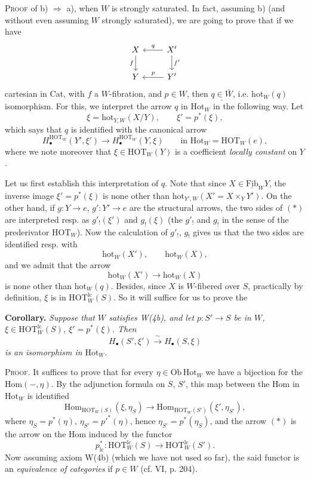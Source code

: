 \documentclass[11pt]{article}
\newcommand{\printedpage}[1]{\marginpar{\footnotesize p.~#1}}
\newcommand{\msp}[1]{\marginpar{\footnotesize [#1]}}
\newcommand{\Fib}{\mathrm{Fib}}
\newcommand{\HOT}{\mathrm{HOT}}
\newcommand{\Hot}{\mathrm{Hot}}
\newcommand{\hot}{\mathrm{hot}}
\newcommand{\Hom}{\mathrm{Hom}}
\begin{document}
\textsc{Proof} of b) $\Longrightarrow$ a), when $W$ is strongly saturated. In fact, assuming b) (and without even assuming $W$ strongly saturated), we are going to prove that if we have
\[
\begin{tikzcd}
X & X' \arrow[l,"q"'] \arrow[d,"f'"] \\
Y \arrow[from=u,"f"'] & Y' \arrow[l,"p"']
\end{tikzcd}
\]
cartesian in Cat, with
\msp{page 55}
$f$ a $W$-fibration, and $p \in W$, then $\underline{q \in \bar{W}}$, i.e. $\hot_W(q)$ isomorphism. For this, we interpret the arrow $q$ in $\Hot_W$ in the following way. Let
\[
\xi = \hot_{Y,W}(X/Y), \qquad \xi' = p^*(\xi),
\]
\printedpage{41}
which says that $q$ is identified with the canonical arrow
\[
H_\bullet^{\HOT_W}(Y',\xi') \longrightarrow H_\bullet^{\HOT_W}(Y,\xi) \qquad \text{in } \Hot_W = \HOT_W(e), \tag*{$(*)$}
\]
where we note moreover that $\xi \in \HOT_W(Y)$ is a coefficient \textit{locally constant} on $Y$.

Let us first establish this interpretation of $q$. Note that since $X \in \underline{\Fib}_W Y$, the inverse image $\xi' = p^*(\xi)$ is none other than $\hot_{Y',W}(X' = X \times_Y Y')$. On the other hand, if $g : Y \longrightarrow e$, $g' : Y' \longrightarrow e$ are the structural arrows, the two sides of $(*)$ are interpreted resp. as $g'_!(\xi')$ and $g_!(\xi)$ (the $g'_!$ and $g_!$ in the sense of the prederivator $\HOT_W$). Now the calculation of $g'_!$, $g_!$ gives us that the two sides are identified resp. with
\[
\hot_W(X'), \qquad \hot_W(X),
\]
and we admit that the arrow
\[
\hot_W(X') \longrightarrow \hot_W(X)
\]
is none other than $\hot_W(q)$. Besides, since $X$ is $W$-fibered over $S$, practically by definition, $\xi$ is in $\HOT^{\mathrm{lc}}_W(S)$. So it will suffice for us to prove the

\msp{page 56}

\textbf{Corollary.} \textit{Suppose that $W$ satisfies W(4b), and let $p : S' \longrightarrow S$ be in $W$, $\xi \in \HOT^{\mathrm{lc}}_W(S)$, $\xi' = p^*(\xi)$. Then}
\[
H_\bullet(S',\xi') \xrightarrow{\ \sim\ } H_\bullet(S,\xi)
\]
\textit{is an isomorphism in} $\Hot_W$.

\textsc{Proof}. It suffices to prove that for every $\eta \in \mathrm{Ob}\,\Hot_W$ we have a bijection for the $\Hom(-,\eta)$. By the adjunction formula on $S$, $S'$, this map between the Hom in $\Hot_W$ is identified
\[
\Hom_{\HOT_W(S)}(\xi,\eta_S) \longrightarrow \Hom_{\HOT_W(S')}(\xi',\eta_{S'}),
\]
where $\eta_S = p^*(\eta)$, $\eta_{S'} = p'^*(\eta)$, hence $\eta_{S'} = p^*(\eta_S)$, and the arrow $(*)$ is the arrow on the Hom induced by the functor
\[
p^*_{\mathrm{lc}} : \HOT^{\mathrm{lc}}_W(S) \longrightarrow \HOT^{\mathrm{lc}}_W(S').
\]
Now assuming axiom W(4b) (which we have not used so far), the said functor is an \textit{equivalence of categories} if $p \in W$ (cf. VI, p. 204).
\end{document}
